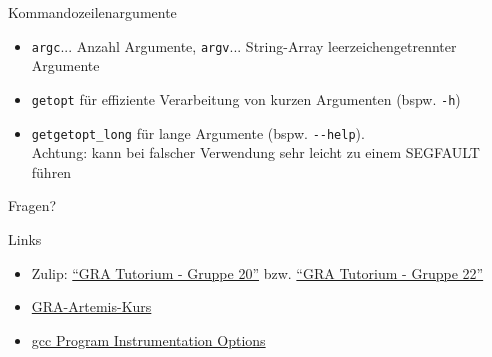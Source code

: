 \begin{frame}[c, fragile]{Kommandozeilenargumente}{}
	\begin{itemize}
		\item \verb|argc|... Anzahl Argumente, \verb|argv|... String-Array leerzeichengetrennter Argumente
		\item \verb|getopt| für effiziente Verarbeitung von kurzen Argumenten (bspw. \verb|-h|)
		\item \verb|getgetopt_long| für lange Argumente (bspw. \verb|--help|).\\Achtung: kann bei falscher
		      Verwendung sehr leicht zu einem SEGFAULT führen
	\end{itemize}
\end{frame}

\begin{frame}[c]{}{}
	\begin{center}
		\LARGE Fragen?
	\end{center}
\end{frame}

\begin{frame}[fragile, c]{Links}{}
	\begin{itemize}
		\item Zulip: \href{https://zulip.in.tum.de/#narrow/stream/2267-GRA-Tutorium---Gruppe-20}{\enquote{GRA Tutorium - Gruppe 20}}
		      bzw. \href{https://zulip.in.tum.de/#narrow/stream/2269-GRA-Tutorium---Gruppe-22}{\enquote{GRA Tutorium - Gruppe 22}}
		\item \href{https://artemis.in.tum.de/courses/329}{GRA-Artemis-Kurs}
		\item \href{https://gcc.gnu.org/onlinedocs/gcc/Instrumentation-Options.html}{gcc Program Instrumentation Options}
	\end{itemize}
\end{frame}

\maketitle


